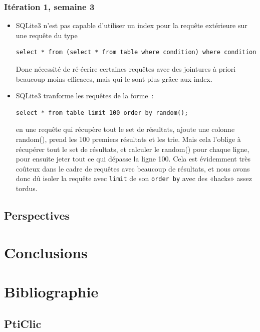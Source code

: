 \documentclass[a4paper,11pt,french]{article}
\begin{document}
\subsubsection{Itération 1, semaine 3}
\begin{itemize}
\item SQLite3 n'est pas capable d'utiliser un index pour la requête extérieure sur une requête du type

\begin{verbatim}
select * from (select * from table where condition) where condition
\end{verbatim}

Donc nécessité de ré-écrire certaines requêtes avec des jointures à priori beaucoup moins efficaces, mais qui le sont plus grâce aux index.
\item SQLite3 tranforme les requêtes de la forme~:

\begin{verbatim}
select * from table limit 100 order by random();
\end{verbatim}

  en une requête qui récupère tout le set de résultats, ajoute une colonne random(), prend les 100 premiers résultats et les trie. Mais cela
  l'oblige à récupérer tout le set de résultats, et calculer le random() pour chaque ligne, pour ensuite jeter tout ce qui dépasse la ligne
  100. Cela est évidemment très coûteux dans le cadre de requêtes avec beaucoup de résultats, et nous avons donc dû isoler la requête avec
  \verb!limit! de son \verb!order by! avec des «hacks» assez tordus.
\end{itemize}

\subsection{Perspectives}

\section{Conclusions}

\newpage


\section{Bibliographie}
\subsection{PtiClic}
\end{document}

